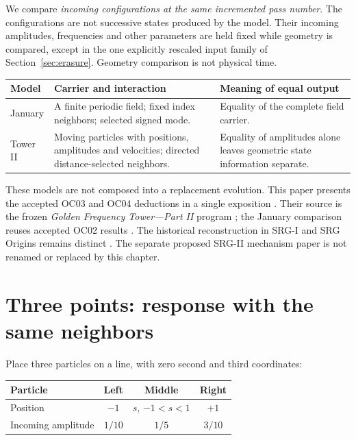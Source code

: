 \documentclass[11pt,a4paper]{article}
\theoremstyle{remark}\newtheorem{remark}[theorem]{Remark}
\numberwithin{equation}{section}
\begin{document}
We compare \emph{incoming configurations at the same incremented pass number}.
The configurations are not successive states produced by the model.
Their incoming amplitudes, frequencies and other parameters are held fixed
while geometry is compared, except in the one explicitly rescaled input
family of Section~\ref{sec:erasure}. Geometry comparison is not physical time.

\begin{center}
\begin{tabularx}{\linewidth}{@{}p{24mm}YY@{}}
\toprule
Model & Carrier and interaction & Meaning of equal output\\
\midrule
January & A finite periodic field; fixed index neighbors; selected signed mode.
& Equality of the complete field carrier.\\
Tower II & Moving particles with positions, amplitudes and velocities;
directed distance-selected neighbors.
& Equality of amplitudes alone leaves geometric state information separate.\\
\bottomrule
\end{tabularx}
\end{center}

These models are not composed into a replacement evolution. This paper presents
the accepted OC03 and OC04 deductions in a single exposition
\cite{OC03,OC04}. Their source is the frozen \emph{Golden Frequency Tower---Part II}
program \cite{T}; the January comparison reuses accepted OC02 results \cite{G}.
The historical reconstruction in SRG-I and SRG Origins remains distinct
\cite{SRGI,Origins}. The separate proposed SRG-II mechanism paper is not
renamed or replaced by this chapter.

\section{Three points: response with the same neighbors}\label{sec:three}

Place three particles on a line, with zero second and third coordinates:

\begin{center}
\begin{tabular}{@{}lccc@{}}
\toprule
Particle & Left & Middle & Right\\
\midrule
Position & $-1$ & $s$, \quad $-1<s<1$ & $+1$\\
Incoming amplitude & $1/10$ & $1/5$ & $3/10$\\
\bottomrule
\end{tabular}
\end{center}
\end{document}
